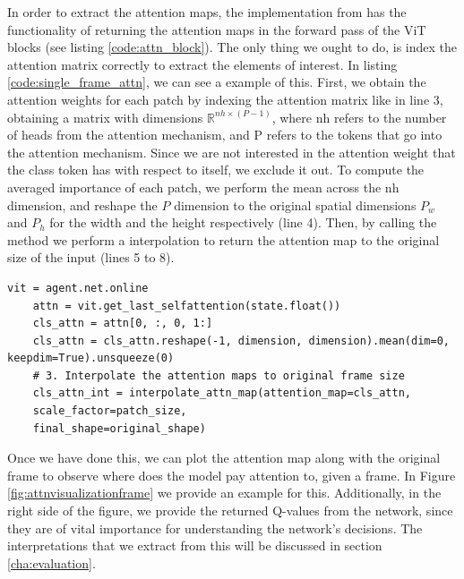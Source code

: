 In order to extract the attention maps, the implementation from \cite{caron2021emerging} has the functionality of returning the attention maps in the forward pass of the ViT blocks (see listing \ref{code:attn_block}). The only thing we ought to do, is index the attention matrix correctly to extract the elements of interest. In listing \ref{code:single_frame_attn}, we can see a example of this. First, we obtain the attention weights for each patch by indexing the attention matrix like  in line 3, obtaining a matrix with dimensions $\mathbb{R}^{nh \times (P-1)}$, where nh refers to the number of heads from the attention mechanism, and P refers to the tokens that go into the attention mechanism. Since we are not interested in the attention weight that the class token has with respect to itself, we exclude it out. To compute the averaged importance of each patch, we perform the mean across the nh dimension, and reshape the $P$ dimension to the original spatial dimensions $P_w$ and $P_h$ for the width and the height respectively (line 4). Then, by calling the method  we perform a interpolation to return the attention map to the original size of the input (lines 5 to 8).

\begin{lstlisting}[caption={Attention map extractor for a single frame}, label={code:single_frame_attn}]
	vit = agent.net.online
	attn = vit.get_last_selfattention(state.float())
	cls_attn = attn[0, :, 0, 1:]
	cls_attn = cls_attn.reshape(-1, dimension, dimension).mean(dim=0, keepdim=True).unsqueeze(0)
	# 3. Interpolate the attention maps to original frame size
	cls_attn_int = interpolate_attn_map(attention_map=cls_attn, 
	scale_factor=patch_size,
	final_shape=original_shape)
\end{lstlisting}

Once we have done this, we can plot the attention map along with the original frame to observe where does the model pay attention to, given a frame. In Figure \ref{fig:attnvisualizationframe} we provide an example for this. Additionally, in the right side of the figure, we provide the returned Q-values from the network, since they are of vital importance for understanding the network's decisions. The interpretations that we extract from this will be discussed in section \ref{cha:evaluation}.

